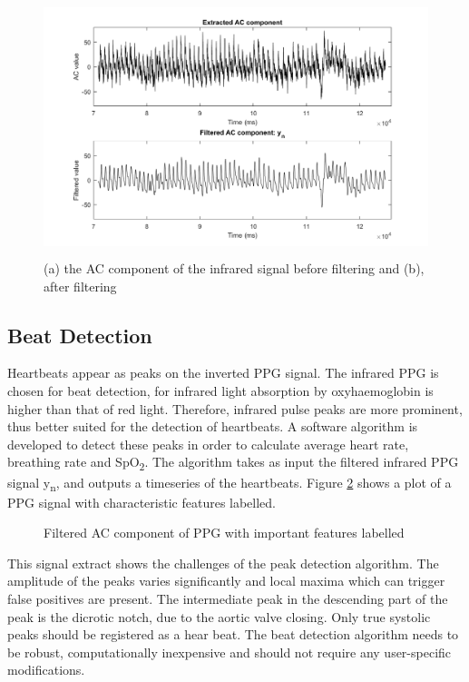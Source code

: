 \begin{figure}[H]
   \centering
   \includegraphics[width=12cm,height=7.5cm]{figs/PPG_Filter.png}
   \caption{(a) the AC component of the infrared signal before filtering and (b), after filtering}
   \label{fig:PPG_Filter}
\end{figure}

\subsection{Beat Detection}
Heartbeats appear as peaks on the inverted PPG signal. The infrared PPG is chosen for beat detection, for infrared light absorption by oxyhaemoglobin is higher than that of red light. Therefore, infrared pulse peaks are more prominent, thus better suited for the detection of heartbeats. A software algorithm is developed to detect these peaks in order to calculate average heart rate, breathing rate and SpO\textsubscript{2}. The algorithm takes as input the filtered infrared PPG signal y\textsubscript{n}, and outputs a timeseries of the heartbeats. Figure \ref{fig:PPG_SignalLabels} shows a plot of a PPG signal with characteristic features labelled.

\begin{figure}[H]
\centering
\graphicspath{{figs/}}

\caption{Filtered AC component of PPG with important features labelled}
\label{fig:PPG_SignalLabels}
\end{figure}

This signal extract shows the challenges of the peak detection algorithm. The amplitude of the peaks varies significantly and local maxima which can trigger false positives are present. The intermediate peak in the descending part of the peak is the dicrotic notch, due to the aortic valve closing. Only true systolic peaks should be registered as a hear beat. The beat detection algorithm needs to be robust, computationally inexpensive and should not require any user-specific modifications. 

